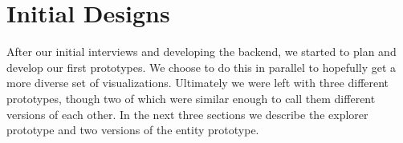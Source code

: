 \section{Initial Designs}
 
After our initial interviews and developing the backend, we started to plan and develop our first prototypes. 
We choose to do this in parallel to hopefully get a more diverse set of visualizations. Ultimately we were 
left with three different prototypes, though two of which were similar enough to call them different versions 
of each other. In the next three sections we describe the explorer prototype and two versions of the entity
prototype.



